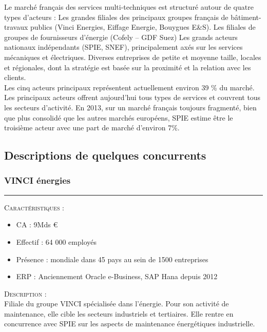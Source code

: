 Le marché français des services multi-techniques est structuré autour de quatre types d’acteurs : 
Les grandes filiales des principaux groupes français de bâtiment-travaux publics (Vinci Energies, Eiffage Energie, Bouygues E\&S). 
Les filiales de groupes de fournisseurs d’énergie (Cofely – GDF Suez)
Les grands acteurs nationaux indépendants (SPIE, SNEF), principalement axés sur les services mécaniques et électriques.
Diverses entreprises de petite et moyenne taille, locales et régionales, dont la stratégie est basée sur la proximité et la relation avec les clients. \\

Les cinq acteurs principaux représentent actuellement environ 39 \% du marché. Les principaux acteurs offrent aujourd’hui tous types de services et couvrent tous les secteurs d’activité. En 2013, sur un marché français toujours fragmenté, bien que plus consolidé que les autres marchés européens, SPIE estime être le troisième acteur avec une part de marché d’environ 7\%.

\subsection{Descriptions de quelques concurrents}
 
\subsubsection{VINCI énergies}
\hrule

\begin{shaded}
    \noindent\textsc{Caractéristiques} : \\
    \begin{itemize}
        \item CA : 9Mds €
        \item Effectif : 64 000 employés
        \item Présence : mondiale dans 45 pays au sein de 1500 entreprises
        \item ERP : Anciennement Oracle e-Business, SAP Hana depuis 2012\\
    \end{itemize}
\end{shaded}

\noindent\textsc{Description} : \\

Filiale du groupe VINCI spécialisée dans l’énergie. Pour son activité de maintenance, elle cible les secteurs industriels et tertiaires. Elle rentre en concurrence avec SPIE sur les aspects de maintenance énergétiques industrielle.

